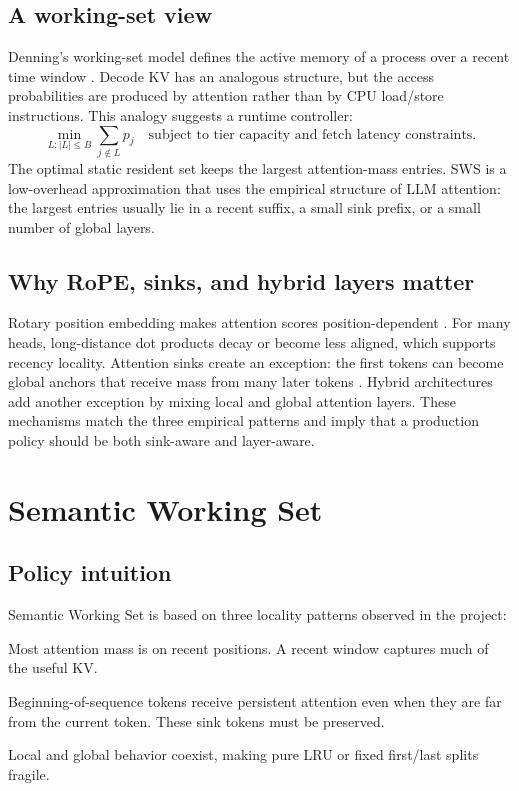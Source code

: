 \documentclass[11pt]{article}
\newcommand{\fullmethod}{Semantic Working Set}
\newcommand{\sws}{SWS}
\theoremstyle{definition}
\theoremstyle{plain}
\begin{document}
\subsection{A working-set view}
Denning's working-set model defines the active memory of a process over a recent time window \citep{denning1968working}.  Decode KV has an analogous structure, but the access probabilities are produced by attention rather than by CPU load/store instructions.  This analogy suggests a runtime controller:
\begin{equation}
  \min_{L: |L|\le B} \sum_{j\notin L} p_j \quad \text{subject to tier capacity and fetch latency constraints.}
\end{equation}
The optimal static resident set keeps the largest attention-mass entries.  \sws{} is a low-overhead approximation that uses the empirical structure of LLM attention: the largest entries usually lie in a recent suffix, a small sink prefix, or a small number of global layers.

\subsection{Why RoPE, sinks, and hybrid layers matter}
Rotary position embedding makes attention scores position-dependent \citep{su2021roformer}.  For many heads, long-distance dot products decay or become less aligned, which supports recency locality.  Attention sinks create an exception: the first tokens can become global anchors that receive mass from many later tokens \citep{xiao2023streamingllm}.  Hybrid architectures add another exception by mixing local and global attention layers.  These mechanisms match the three empirical patterns and imply that a production policy should be both sink-aware and layer-aware.

\section{Semantic Working Set}
\label{sec:method}

\subsection{Policy intuition}
\fullmethod{} is based on three locality patterns observed in the project:
\begin{description}[leftmargin=1.5em,itemsep=2pt]
  \item[Local-dominant.] Most attention mass is on recent positions.  A recent window captures much of the useful KV.
  \item[Sink-dominant.] Beginning-of-sequence tokens receive persistent attention even when they are far from the current token.  These sink tokens must be preserved.
  \item[Hybrid.] Local and global behavior coexist, making pure LRU or fixed first/last splits fragile.
\end{description}
\end{document}
